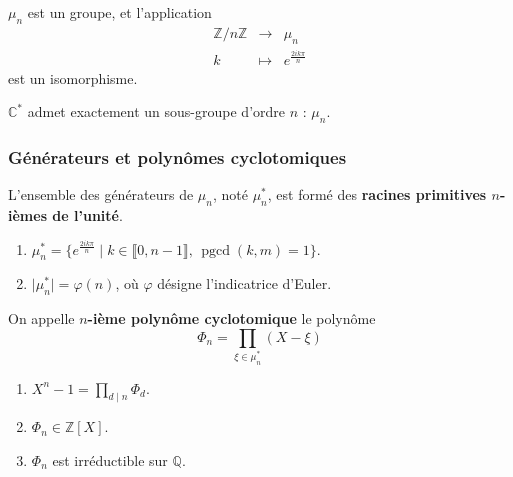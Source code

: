 
  \begin{proposition}
    $\mu_n$ est un groupe, et l'application
    \[
    \begin{array}{ccc}
      \mathbb{Z}/n\mathbb{Z} &\rightarrow& \mu_n \\
      k &\mapsto& e^{\frac{2ik\pi}{n}}
    \end{array}
    \]
    est un isomorphisme.
  \end{proposition}


  \begin{proposition}
    $\mathbb{C}^*$ admet exactement un sous-groupe d'ordre $n$ : $\mu_n$.
  \end{proposition}

  \subsubsection{Générateurs et polynômes cyclotomiques}


  \begin{definition}
    L'ensemble des générateurs de $\mu_n$, noté $\mu_n^*$, est formé des \textbf{racines primitives $n$-ièmes de l'unité}.
  \end{definition}

  \begin{proposition}
    \begin{enumerate}[label={\bfseries(\roman*)}]
      \item $\mu_n^* = \{ e^{\frac{2ik\pi}{n}} \mid k \in \llbracket 0, n-1 \rrbracket, \, \operatorname{pgcd}(k, m) = 1 \}$.
      \item $\vert \mu_n^* \vert = \varphi(n)$, où $\varphi$ désigne l'indicatrice d'Euler.
    \end{enumerate}
  \end{proposition}

  \begin{definition}
    On appelle \textbf{$n$-ième polynôme cyclotomique} le polynôme
    \[ \Phi_n = \prod_{\xi \in \mu_n^*} (X - \xi) \]
  \end{definition}

  \begin{theorem}
    \begin{enumerate}[label={\bfseries(\roman*)}]
      \item $X^n - 1 = \prod_{d \mid n} \Phi_d$.
      \item $\Phi_n \in \mathbb{Z}[X]$.
      \item $\Phi_n$ est irréductible sur $\mathbb{Q}$.
    \end{enumerate}
  \end{theorem}

